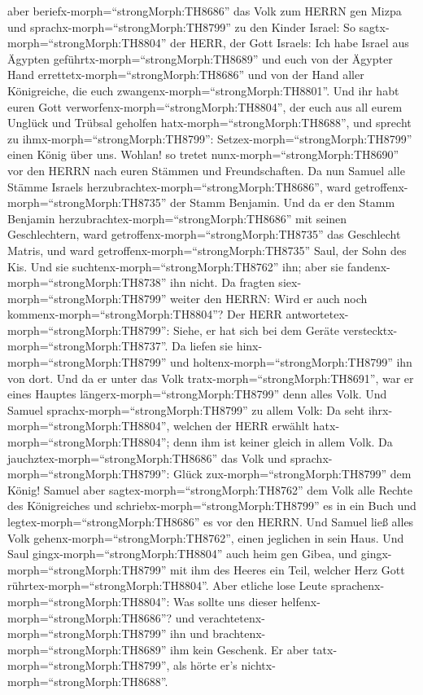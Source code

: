 aber beriefx-morph=``strongMorph:TH8686'' das Volk zum HERRN gen Mizpa
 und sprachx-morph=``strongMorph:TH8799'' zu den Kinder
Israel: So sagtx-morph=``strongMorph:TH8804'' der HERR, der Gott
Israels: Ich habe Israel aus Ägypten
geführtx-morph=``strongMorph:TH8689'' und euch von der Ägypter Hand
errettetx-morph=``strongMorph:TH8686'' und von der Hand aller
Königreiche, die euch zwangenx-morph=``strongMorph:TH8801''.
 Und ihr habt euren Gott
verworfenx-morph=``strongMorph:TH8804'', der euch aus all eurem Unglück
und Trübsal geholfen hatx-morph=``strongMorph:TH8688'', und sprecht zu
ihmx-morph=``strongMorph:TH8799'': Setzex-morph=``strongMorph:TH8799''
einen König über uns. Wohlan! so tretet
nunx-morph=``strongMorph:TH8690'' vor den HERRN nach euren Stämmen und
Freundschaften.  Da nun Samuel alle Stämme Israels
herzubrachtex-morph=``strongMorph:TH8686'', ward
getroffenx-morph=``strongMorph:TH8735'' der Stamm Benjamin.
 Und da er den Stamm Benjamin
herzubrachtex-morph=``strongMorph:TH8686'' mit seinen Geschlechtern,
ward getroffenx-morph=``strongMorph:TH8735'' das Geschlecht Matris, und
ward getroffenx-morph=``strongMorph:TH8735'' Saul, der Sohn des Kis. Und
sie suchtenx-morph=``strongMorph:TH8762'' ihn; aber sie
fandenx-morph=``strongMorph:TH8738'' ihn nicht.  Da fragten
siex-morph=``strongMorph:TH8799'' weiter den HERRN: Wird er auch noch
kommenx-morph=``strongMorph:TH8804''? Der HERR
antwortetex-morph=``strongMorph:TH8799'': Siehe, er hat sich bei dem
Geräte verstecktx-morph=``strongMorph:TH8737''.  Da liefen
sie hinx-morph=``strongMorph:TH8799'' und
holtenx-morph=``strongMorph:TH8799'' ihn von dort. Und da er unter das
Volk tratx-morph=``strongMorph:TH8691'', war er eines Hauptes
längerx-morph=``strongMorph:TH8799'' denn alles Volk.  Und
Samuel sprachx-morph=``strongMorph:TH8799'' zu allem Volk: Da seht
ihrx-morph=``strongMorph:TH8804'', welchen der HERR erwählt
hatx-morph=``strongMorph:TH8804''; denn ihm ist keiner gleich in allem
Volk. Da jauchztex-morph=``strongMorph:TH8686'' das Volk und
sprachx-morph=``strongMorph:TH8799'': Glück
zux-morph=``strongMorph:TH8799'' dem König!  Samuel aber
sagtex-morph=``strongMorph:TH8762'' dem Volk alle Rechte des
Königreiches und schriebx-morph=``strongMorph:TH8799'' es in ein Buch
und legtex-morph=``strongMorph:TH8686'' es vor den HERRN. Und Samuel
ließ alles Volk gehenx-morph=``strongMorph:TH8762'', einen jeglichen in
sein Haus.  Und Saul gingx-morph=``strongMorph:TH8804''
auch heim gen Gibea, und gingx-morph=``strongMorph:TH8799'' mit ihm des
Heeres ein Teil, welcher Herz Gott rührtex-morph=``strongMorph:TH8804''.
 Aber etliche lose Leute
sprachenx-morph=``strongMorph:TH8804'': Was sollte uns dieser
helfenx-morph=``strongMorph:TH8686''? und
verachtetenx-morph=``strongMorph:TH8799'' ihn und
brachtenx-morph=``strongMorph:TH8689'' ihm kein Geschenk. Er aber
tatx-morph=``strongMorph:TH8799'', als hörte er's
nichtx-morph=``strongMorph:TH8688''.

